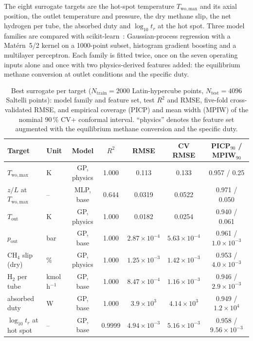 \documentclass[final,3p,times]{elsarticle}
\begin{document}
The eight surrogate targets are the hot-spot temperature $T_{\mathrm{wo,max}}$ and its axial position, the outlet temperature and pressure, the dry methane slip, the net hydrogen per tube, the absorbed duty and $\log_{10} t_r$ at the hot spot. Three model families are compared with scikit-learn~\cite{sklearn}: Gaussian-process regression with a Mat\'ern~5/2 kernel on a 1000-point subset, histogram gradient boosting and a multilayer perceptron. Each family is fitted twice, once on the seven operating inputs alone and once with two physics-derived features added: the equilibrium methane conversion at outlet conditions and the specific duty.
\begin{table}[h]
\centering\footnotesize
\caption{Best surrogate per target ($N_{\mathrm{train}} = 2000$ Latin-hypercube points, $N_{\mathrm{test}} = 4096$ Saltelli points): model family and feature set, test $R^2$ and RMSE, five-fold cross-validated RMSE, and empirical coverage (PICP) and mean width (MPIW) of the nominal 90\,\% CV+ conformal interval. ``physics'' denotes the feature set augmented with the equilibrium methane conversion and the specific duty.}
\label{tab:surrogate}
\begin{tabular}{llccccc}
\toprule
Target & Unit & Model & $R^2$ & RMSE & CV RMSE & PICP$_{90}$ / MPIW$_{90}$ \\
\midrule
$T_{\mathrm{wo,max}}$ & K & GP, physics & 1.000 & 0.113 & 0.133 & 0.957 / 0.25 \\
$z/L$ at $T_{\mathrm{wo,max}}$ & -- & MLP, base & 0.644 & 0.0319 & 0.0522 & 0.971 / 0.050 \\
$T_{\mathrm{out}}$ & K & GP, physics & 1.000 & 0.0182 & 0.0254 & 0.940 / 0.061 \\
$p_{\mathrm{out}}$ & bar & GP, base & 1.000 & $2.87\times10^{-4}$ & $5.63\times10^{-4}$ & 0.961 / $1.0\times10^{-3}$ \\
CH$_4$ slip (dry) & \% & GP, physics & 1.000 & $1.25\times10^{-3}$ & $1.42\times10^{-3}$ & 0.953 / $4.0\times10^{-3}$ \\
H$_2$ per tube & kmol\,h$^{-1}$ & GP, base & 1.000 & $8.47\times10^{-4}$ & $1.16\times10^{-3}$ & 0.946 / $2.9\times10^{-3}$ \\
absorbed duty & W & GP, base & 1.000 & $3.9\times10^{3}$ & $4.14\times10^{3}$ & 0.949 / $1.2\times10^{4}$ \\
$\log_{10} t_r$ at hot spot & -- & GP, base & 0.9999 & $4.94\times10^{-3}$ & $5.16\times10^{-3}$ & 0.958 / $9.56\times10^{-3}$ \\
\bottomrule
\end{tabular}
\end{table}
\end{document}
